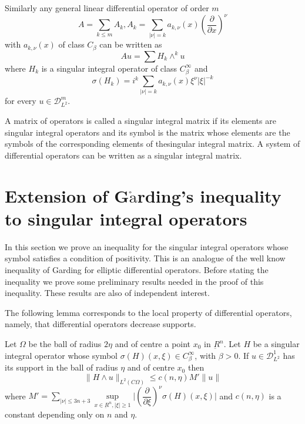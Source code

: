Similarly any general linear differential operator of order $m$
$$
A = \sum\limits_{k \leq m} A_k, A_k = \sum \limits_{| \nu | =k}
a_{k, \nu} (x) \left(\dfrac{\partial}{\partial x}\right) ^\nu
$$ 
with $a_{k, \nu}(x) $ of class $ C_\beta$ can be written as  
\begin{equation*}
Au = \sum H_k \wedge^k u \tag{4.16}\label{chap3-eq4.16}
\end{equation*}
where $H_k$ is a singular integral operator of class $C^\infty_\beta$
and  
\begin{equation*}
\sigma (H_k) = i^k \sum\limits_{| \nu | = k} a_{k, \nu} (x) \xi^\nu |
\xi |^{-k} \tag{4.17} \label{chap3-eq4.17}
\end{equation*}
for every $ u \in \mathscr{D}^m_{L^2}$.

A matrix of operators is called a singular integral matrix if its
elements are singular integral operators and its symbol is the matrix
whose elements are the symbols of the corresponding elements of
the\pageoriginale singular integral matrix. A system of differential
operators can be written as a singular integral matrix.   

\section[Extension of G$\ring{\text{a}}$rding's...]{Extension of G$\ring{\text{a}}$rding's inequality to singular
  integral operators}\label{chap3-sec5} %

In this section we prove an inequality for the singular integral
operators whose symbol satisfies a condition of positivity. This is an
analogue of the well know inequality of Garding for elliptic
differential operators. Before stating the inequality we prove some
preliminary results needed in the proof of this inequality. These
results are also of independent interest.  

The following lemma corresponds to the local property of differential
operators, namely, that differential operators decrease supports.  

\setcounter{lemma}{0}
\begin{lemma}\label{chap3-sec5-lem1}%
 Let $ \Omega$ be the ball of radius
$2 \eta$ and of centre a point $x_0$ in $ \underbar{R}^n$. Let $H$ be
a singular integral operator whose symbol $\sigma (H) (x, \xi) \in
C^\infty_\beta$, with $\beta > 0$. If $ u \in \mathscr{D}^1_{L^2}$
has its support in the ball of radius $\eta$ and of centre $x_0$ then   
\begin{equation}
\parallel H \wedge u \parallel_{L^2 (C \Omega)} \leq c(n, \eta) M'
\parallel u \parallel \tag{5.1}\label{chap3-eq5.1} 
\end{equation}
where $M' = \sum\limits_{| \nu | \leq 3n +3} \sup\limits_{ x \in
  \underbar{R}^n, | \xi | \geq 1} \big| (\dfrac{\partial}{\partial
  \xi})^\nu \sigma (H) (x, \xi ) \big|$ and $ c (n, \eta)$ is a constant
depending only on $n$ and $\eta$. 
\end{lemma}

